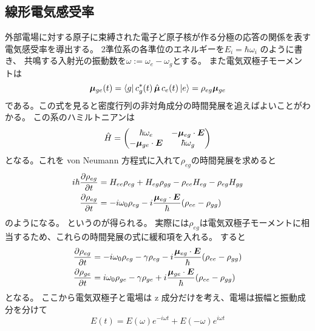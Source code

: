 \documentclass[11pt,dvipdfmx,a4paper]{jsarticle}
\begin{document}
\subsection{線形電気感受率}
外部電場に対する原子に束縛された電子ど原子核が作る分極の応答の関係を表す電気感受率を導出する。
2準位系の各準位のエネルギーを\(E_i = \hbar \omega_i\) のように書き、
共鳴する入射光の振動数を\(\omega := \omega_e -\omega_g\)とする。
また電気双極子モーメントは
\begin{equation}
	\vb*{\mu}_{ge}(t) = \bra{g}c_g^*(t)\,\hat{\vb*{\mu}}\,c_e(t)\ket{e}
	= \rho_{eg}\vb*{\mu}_{ge}
\end{equation}
である。この式を見ると密度行列の非対角成分の時間発展を追えばよいことがわかる。
この系のハミルトニアンは
\begin{equation}
	\hat{H} =
	\begin{pmatrix}
		\hbar \omega_e  & -\vb*{\mu}_{eg}\cdot\vb*{E}\\
		-\vb*{\mu}_{ge}\cdot\vb*{E} & \hbar \omega_g
	\end{pmatrix}
\end{equation}
となる。これを von Neumann 方程式に入れて\(\rho_{eg}\)の時間発展を求めると
\begin{align}
	i\hbar \pdv{\rho_{eg}}{t} &= H_{ee}\rho_{eg} + H_{eg}\rho_{gg} - \rho_{ee} H_{eg} - \rho_{eg} H_{gg}\\
	\pdv{\rho_{eg}}{t} &= -i\omega_0\rho_{eg} -i\frac{\vb*{\mu}_{eg}\cdot \vb*{E}}{\hbar}(\rho_{ee}-\rho_{gg})
\end{align}
のようになる。
というのが得られる。
実際には\(\rho_{eg}\)は電気双極子モーメントに相当するため、これらの時間発展の式に緩和項を入れる。
すると
\begin{align}
	\pdv{\rho_{eg}}{t} &= -i\omega_0\rho_{eg} -\gamma\rho_{eg} -i\frac{\vb*{\mu}_{eg}\cdot \vb*{E}}{\hbar}(\rho_{ee}-\rho_{gg})\\
	\pdv{\rho_{ge}}{t} &=  i\omega_0\rho_{ge} -\gamma\rho_{ge} +i\frac{\vb*{\mu}_{ge}\cdot \vb*{E}}{\hbar}(\rho_{ee}-\rho_{gg})
\end{align}
となる。
ここから電気双極子と電場は z 成分だけを考え、電場は振幅と振動成分を分けて
\begin{equation}
	E(t) = E(\omega)e^{-i\omega t} + E(-\omega) e^{i\omega t} \label{eq:E_fourier}
\end{equation}
\end{document}
